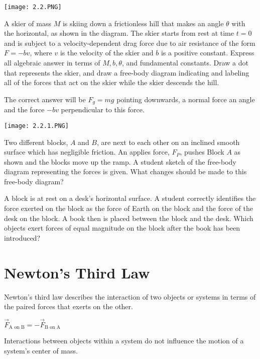 \documentclass[../mech.tex]{subfiles}
\begin{document}
\begin{example}
    \begin{center}
        \texttt{[image: 2.2.PNG]}
    \end{center}
    A skier of mass $M$ is skiing down a frictionless hill that makes an angle $\theta$ with the horizontal, as shown in the diagram. The skier starts from rest at time $t=0$ and is subject to a velocity-dependent drag force due to air 
    resistance of the form $F=-bv$, where $v$ is the velocity of the skier and $b$ is a positive constant. Express all algebraic answer in terms of $M, b, \theta$, and fundamental constants. Draw a dot that represents the skier, and draw a free-body
    diagram indicating and labeling all of the forces that act on the skier while the skier descends the hill.

    The correct answer will be $F_g=mg$ pointing downwards, a normal force an angle and the force $-bv$ perpendicular to this force. 
\end{example}

\pagebreak
\ex \begin{center}
    \texttt{[image: 2.2.1.PNG]}
\end{center}
Two different blocks, $A$ and $B$, are next to each other on an inclined smooth surface which has negligible friction. An applies force, $F_P$, pushes Block $A$ as shown and the blocks move up the ramp. A student sketch of the free-body diagram representing the forces 
is given. What changes should be made to this free-body diagram?

\ex A block is at rest on a desk's horizontal surface. A student correctly identifies the force exerted on the block as the force of Earth on the block and the force of the desk on the block.
A book then is placed between the block and the desk. Which objects exert forces of equal magnitude on the block after the book has been introduced?

\section{Newton's Third Law}
Newton's third law describes the interaction of two objects or systems in terms of the paired forces that exerts on the other.
\begin{center}
    $\vec{F}_{\text{A on B}} = -\vec{F}_{\text{B on A}}$
\end{center}
Interactions between objects within a system do not influence the motion of a system's center of mass.
\end{document}
